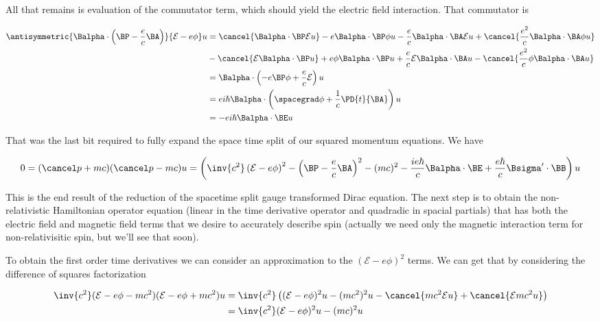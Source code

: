 All that remains is evaluation of the commutator term, which should yield the electric field interaction.  That commutator is

\begin{align*}
\antisymmetric{
\Balpha \cdot \left(\BP - \frac{e}{c} \BA \right)
}
{
\mathcal{E} - e \phi
} u
&=
\cancel{\Balpha \cdot \BP \mathcal{E} u}
- e \Balpha \cdot \BP \phi u
- \frac{e}{c} \Balpha \cdot \BA \mathcal{E} u
+ \cancel{\frac{e^2}{c} \Balpha \cdot \BA \phi u} \\
&
- \cancel{\mathcal{E} \Balpha \cdot \BP u}
+ e \phi \Balpha \cdot \BP u
+ \frac{e}{c} \mathcal{E} \Balpha \cdot \BA u
- \cancel{\frac{e^2}{c} \phi \Balpha \cdot \BA u} \\
&=
\Balpha \cdot \left( - e \BP \phi
+ \frac{e}{c} \mathcal{E} \right) u \\
&=
e i \hbar \Balpha \cdot \left( \spacegrad \phi
+ \frac{1}{c} \PD{t}{\BA} \right) u \\
&=
- e i \hbar \Balpha \cdot \BE u
\end{align*}

That was the last bit required to fully expand the space time split of our squared momentum equations.  We have

\begin{equation}\label{eqn:diracGauge:400}
0
=
(\pslash + mc)(\pslash - mc) u
=
\left(
\inv{c^2} \left( \mathcal{E} - e \phi \right)^2
- \left(\BP - \frac{e}{c} \BA \right)^2
- (mc)^2
- \frac{i e \hbar}{c} \Balpha \cdot \BE
+ \frac{e \hbar}{c} \Bsigma' \cdot \BB
\right) u
\end{equation}

This is the end result of the reduction of the spacetime split gauge transformed Dirac equation.  The next step is to obtain the non-relativistic Hamiltonian operator equation (linear in the time derivative operator and quadradic in spacial partials) that has both the electric field and magnetic field terms that we desire to accurately describe spin (actually we need only the magnetic interaction term for non-relativisitic spin, but we'll see that soon).

To obtain the first order time derivatives we can consider an approximation to the $(\mathcal{E} - e \phi)^2$ terms.  We can get that by considering the difference of squares factorization

\begin{align*}
\inv{c^2} ( \mathcal{E} - e \phi - m c^2) ( \mathcal{E} - e \phi + m c^2) u
&=
\inv{c^2} \left(
( \mathcal{E} - e \phi )^2 u - (m c^2)^2 u
- \cancel{m c^2 \mathcal{E} u}
+ \cancel{\mathcal{E} m c^2 u} \right) \\
&=
\inv{c^2} ( \mathcal{E} - e \phi )^2 u - (m c)^2 u
\end{align*}

